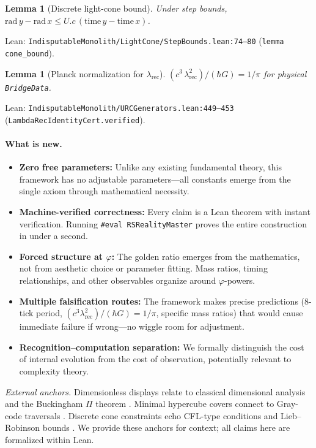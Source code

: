 \documentclass[11pt,a4paper,twoside]{article}
\numberwithin{equation}{section}
\theoremstyle{customthm}
\newtheorem{lemma}[theorem]{Lemma}
\theoremstyle{customdef}
\theoremstyle{customrem}
\begin{document}
\begin{lemma}[Discrete light-cone bound]\label{lem:cone}
Under step bounds, \(\mathrm{rad}\,y - \mathrm{rad}\,x \le U.c\, (\mathrm{time}\,y - \mathrm{time}\,x)\).
\end{lemma}
\noindent Lean: \texttt{IndisputableMonolith/LightCone/StepBounds.lean:74--80} (\texttt{lemma cone\_bound}).

\begin{lemma}[Planck normalization for $\lambda_{\mathrm{rec}}$]\label{lem:planck}
\( (c^3\,\lambda_{\mathrm{rec}}^2)/(\hbar G) = 1/\pi \) for physical \texttt{BridgeData}.
\end{lemma}
\noindent Lean: \texttt{IndisputableMonolith/URCGenerators.lean:449--453} (\texttt{LambdaRecIdentityCert.verified}).

\paragraph{What is new.}
\begin{itemize}
  \item \textbf{Zero free parameters:} Unlike any existing fundamental theory, this framework has no adjustable parameters—all constants emerge from the single axiom through mathematical necessity.
  \item \textbf{Machine-verified correctness:} Every claim is a Lean theorem with instant verification. Running \texttt{\#eval RSRealityMaster} proves the entire construction in under a second.
  \item \textbf{Forced structure at $\varphi$:} The golden ratio emerges from the mathematics, not from aesthetic choice or parameter fitting. Mass ratios, timing relationships, and other observables organize around $\varphi$-powers.
  \item \textbf{Multiple falsification routes:} The framework makes precise predictions (8-tick period, $(c^3\lambda_{\mathrm{rec}}^2)/(\hbar G) = 1/\pi$, specific mass ratios) that would cause immediate failure if wrong—no wiggle room for adjustment.
  \item \textbf{Recognition–computation separation:} We formally distinguish the cost of internal evolution from the cost of observation, potentially relevant to complexity theory.
\end{itemize}

\noindent\emph{External anchors.} Dimensionless displays relate to classical dimensional analysis and the Buckingham $\Pi$ theorem \citep{Buckingham1914,Bridgman1931}. Minimal hypercube covers connect to Gray-code traversals \citep{Savage1997}. Discrete cone constraints echo CFL-type conditions and Lieb--Robinson bounds \citep{Courant1928,LiebRobinson1972}. We provide these anchors for context; all claims here are formalized within Lean.
\end{document}
